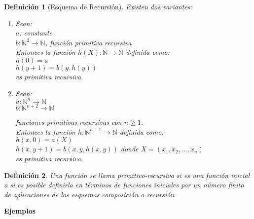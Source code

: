 \documentclass[a4paper,1pt]{report}
\newtheorem*{dfn}{Definición}
\begin{document}
\begin{dfn}[Esquema de Recursión]
Existen dos variantes:

 \begin{enumerate}
  \item Sean: \\
  $a$: constante\\ 
  $b:\mathbb{N}^2\rightarrow\mathbb{N}$, funci\'on primitiva recursiva \\

  Entonces la funci\'on $h(X): \mathbb{N} \rightarrow \mathbb{N}$ definida como:\\
  $h(0)=a$  \\
  $h(y+1)=b(y,h(y))$\\ 
  es primitiva recursiva.


  \item Sean:\\
  $a:\mathbb{N}^n\rightarrow\mathbb{N}$\\
  $b:\mathbb{N}^{n+2}\rightarrow\mathbb{N}$

  funciones primitivas recursivas con  $n\geq 1$.\\

  Entonces la funci\'on $h:\mathbb{N}^{n+1}\rightarrow\mathbb{N}$ definida como:\\
  $h(x,0)=a(X)$\\
  $h(x,y+1)=b(x,y,h(x,y))$ donde $X=(x_1,x_2,\dots,x_n)$\\
  es primitiva recursiva.

 \end{enumerate}

\end{dfn}


\begin{dfn}
 Una función se llama primitivo-recursiva si es una función inicial o si es posible definirla en términos de funciones iniciales por un número finito de aplicaciones de los esquemas composición o recursión
\end{dfn}

\textbf{Ejemplos}
\end{document}
